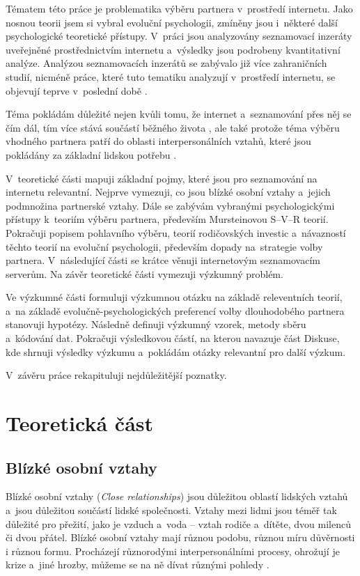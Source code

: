 \documentclass[a4paper, 12pt, notitlepage, oneside, numbers=noenddot]{report}
\begin{document}
Tématem této práce je problematika výběru partnera v~prostředí
internetu.  Jako nosnou teorii jsem si vybral evoluční psychologii,
zmíněny jsou i~některé další psychologické teoretické přístupy.
V~prá\-ci jsou analyzovány seznamovací inzeráty uveřejněné
prostřednictvím internetu a~výsledky jsou podrobeny kvantitativní
analýze.  Analýzou seznamovacích inzerátů se zabývalo již více
zahraničních studií, nicméně práce, které tuto tematiku analyzují
v~prostředí internetu, se objevují teprve v~poslední době
\citep{HallEtAl2010, EllisonEtAl2006, GibbsEtAl2006}.

Téma pokládám důležité nejen kvůli tomu, že internet a~seznamování
přes něj se čím dál, tím více stává součástí běžného života
\citep{EllisonEtAl2006}, ale také protože téma výběru vhodného
partnera patří do oblasti interpersonálních vztahů, které jsou
pokládány za základní lidskou potřebu \citep{Slamenik2008}.

V~teoretické části mapuji základní pojmy, které jsou pro seznamování
na internetu relevantní.  Nejprve vymezuji, co jsou blízké osobní
vztahy a~jejich podmnožina partnerské vztahy.  Dále se zabývám
vybranými psychologickými přístupy k~teoriím výběru partnera,
především Mursteinovou S--V--R teorií.  Pokračuji popisem pohlavního
výběru, teo\-rií rodičovských investic a~návazností těchto teorií na
evoluční psychologii, především dopady na~strategie volby partnera.
V~následující části se krátce věnuji internetovým seznamovacím
serverům.  Na závěr teoretické části vymezuji výzkum\-ný pro\-blém.

Ve výzkumné části formuluji výzkumnou otázku na základě releventních
teorií, a~na základě evolučně-psychologických preferencí volby
dlouhodobého partnera stanovuji hypotézy.  Následně definuji výzkumný
vzorek, metody sběru a~kódování dat.  Pokračuji výsledkovou částí, na
kterou navazuje část Diskuse, kde shrnuji výsledky výzkumu a~pokládám
otázky relevantní pro další výzkum.

V~závěru práce rekapituluji nejdůležitější poznatky.

\chapter[Teoretická část]{Teoretická část}
\section{Blízké osobní vztahy}
Blízké osobní vztahy (\textit{Close relationships}) jsou důležitou
oblastí lidských vztahů a~jsou důležitou součástí lidské společnosti.
Vztahy mezi lidmi jsou téměř tak důležité pro přežití, jako je vzduch
a~voda -- vztah rodiče a~dítěte, dvou milenců či dvou přátel.  Blízké
osobní vztahy mají různou podobu, různou míru důvěrnosti i různou
formu.  Procházejí různorodými interpersonálními procesy, ohrožují je
krize a~jiné hrozby, můžeme se na ně dívat různými pohledy
\citep{HendrickHendrick2000}.
\end{document}
